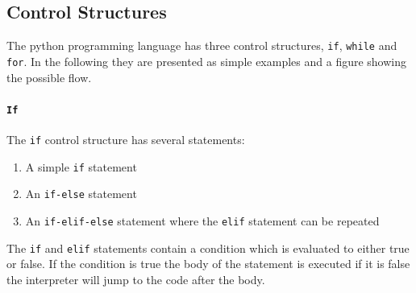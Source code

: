 \subsection{Control Structures}\label{python:control_structures}
The python programming language has three control structures, \texttt{if}, \texttt{while} and \texttt{for}.
In the following they are presented as simple examples and a figure showing the possible flow.

\paragraph{\texttt{If}}
The \texttt{if} control structure has several statements:
\begin{enumerate}
\item A simple \texttt{if} statement
\item An \texttt{if-else} statement
\item An \texttt{if-elif-else} statement where the \texttt{elif} statement can be repeated
\end{enumerate}
The \texttt{if} and \texttt{elif} statements contain a condition which is evaluated to either true or false.
If the condition is true the body of the statement is executed if it is false the interpreter will jump to the code after the body.

